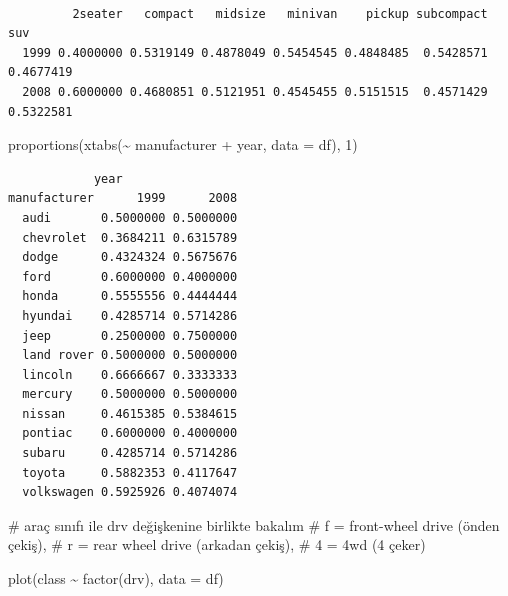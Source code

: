 \documentclass[
  letterpaper,
  DIV=11,
  numbers=noendperiod]{scrreprt}
\newenvironment{Shaded}{\begin{snugshade}}{\end{snugshade}}
\newcommand{\AttributeTok}[1]{\textcolor[rgb]{0.40,0.45,0.13}{#1}}
\newcommand{\CommentTok}[1]{\textcolor[rgb]{0.37,0.37,0.37}{#1}}
\newcommand{\DecValTok}[1]{\textcolor[rgb]{0.68,0.00,0.00}{#1}}
\newcommand{\FunctionTok}[1]{\textcolor[rgb]{0.28,0.35,0.67}{#1}}
\newcommand{\NormalTok}[1]{\textcolor[rgb]{0.00,0.23,0.31}{#1}}
\newcommand{\SpecialCharTok}[1]{\textcolor[rgb]{0.37,0.37,0.37}{#1}}
\begin{document}
\begin{verbatim}
      
         2seater   compact   midsize   minivan    pickup subcompact       suv
  1999 0.4000000 0.5319149 0.4878049 0.5454545 0.4848485  0.5428571 0.4677419
  2008 0.6000000 0.4680851 0.5121951 0.4545455 0.5151515  0.4571429 0.5322581
\end{verbatim}

\begin{Shaded}
\begin{Highlighting}[]
\FunctionTok{proportions}\NormalTok{(}\FunctionTok{xtabs}\NormalTok{(}\SpecialCharTok{\textasciitilde{}}\NormalTok{ manufacturer }\SpecialCharTok{+}\NormalTok{ year, }\AttributeTok{data =}\NormalTok{ df), }\DecValTok{1}\NormalTok{)}
\end{Highlighting}
\end{Shaded}

\begin{verbatim}
            year
manufacturer      1999      2008
  audi       0.5000000 0.5000000
  chevrolet  0.3684211 0.6315789
  dodge      0.4324324 0.5675676
  ford       0.6000000 0.4000000
  honda      0.5555556 0.4444444
  hyundai    0.4285714 0.5714286
  jeep       0.2500000 0.7500000
  land rover 0.5000000 0.5000000
  lincoln    0.6666667 0.3333333
  mercury    0.5000000 0.5000000
  nissan     0.4615385 0.5384615
  pontiac    0.6000000 0.4000000
  subaru     0.4285714 0.5714286
  toyota     0.5882353 0.4117647
  volkswagen 0.5925926 0.4074074
\end{verbatim}

\begin{Shaded}
\begin{Highlighting}[]
\CommentTok{\# araç sınıfı ile drv değişkenine birlikte bakalım}
\CommentTok{\# f = front{-}wheel drive (önden çekiş), }
\CommentTok{\# r = rear wheel drive (arkadan çekiş), }
\CommentTok{\# 4 = 4wd (4 çeker)}

\FunctionTok{plot}\NormalTok{(class }\SpecialCharTok{\textasciitilde{}} \FunctionTok{factor}\NormalTok{(drv), }\AttributeTok{data =}\NormalTok{ df)}
\end{Highlighting}
\end{Shaded}
\end{document}
